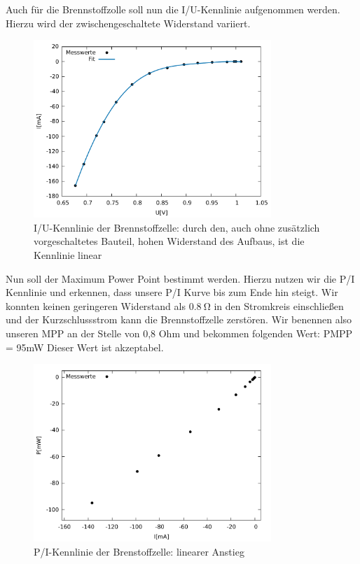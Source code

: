 Auch für die Brennstoffzolle soll nun die I/U-Kennlinie aufgenommen werden. Hierzu wird der zwischengeschaltete Widerstand variiert.
\begin{figure}
	\centering
	\includegraphics[width=0.8\textwidth]{mess/aufg10.pdf}
	\caption{I/U-Kennlinie der Brennstoffzelle: durch den, auch ohne zusätzlich vorgeschaltetes Bauteil, hohen Widerstand des Aufbaus, ist die Kennlinie linear}
	\label{a10}
\end{figure}

Nun soll der Maximum Power Point bestimmt werden. Hierzu nutzen wir die P/I Kennlinie und erkennen, dass unsere P/I Kurve bis zum Ende hin steigt. Wir konnten keinen geringeren Widerstand als $\SI{0,8}{\ohm}$  in den Stromkreis einschließen und der Kurzschlussstrom kann die Brennstoffzelle zerstören. Wir benennen also unseren MPP an der Stelle von 0,8 Ohm und bekommen folgenden Wert: PMPP = 95mW 
Dieser Wert ist akzeptabel.
\begin{figure}[htbp]
	\centering
	\includegraphics[width=0.8\textwidth]{mess/aufg11.pdf}
	\caption{P/I-Kennlinie der Brenstoffzelle: linearer Anstieg}
	\label{a11}
\end{figure}

